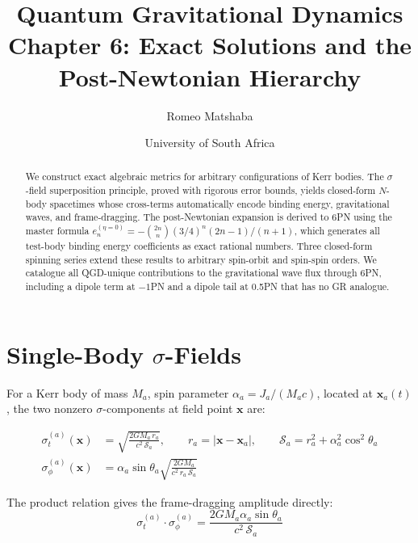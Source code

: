 \documentclass[11pt,a4paper]{article}
\title{\textbf{Quantum Gravitational Dynamics}\\[4pt]
\Large Chapter 6: Exact Solutions and the Post-Newtonian Hierarchy}
\author{Romeo Matshaba}
\date{University of South Africa}
\theoremstyle{plain}
\theoremstyle{definition}
\theoremstyle{remark}
\newcommand{\boldx}{\mathbf{x}}
\newcommand{\sig}[2]{\sigma_{#1}^{(#2)}}
\begin{document}
\maketitle

\begin{abstract}
We construct exact algebraic metrics for arbitrary configurations of Kerr bodies.  The $\sigma$-field superposition principle, proved with rigorous error bounds, yields closed-form $N$-body spacetimes whose cross-terms automatically encode binding energy, gravitational waves, and frame-dragging.  The post-Newtonian expansion is derived to 6PN using the master formula $e_n^{(\eta=0)} = -\binom{2n}{n}(3/4)^n(2n-1)/(n+1)$, which generates all test-body binding energy coefficients as exact rational numbers.  Three closed-form spinning series extend these results to arbitrary spin-orbit and spin-spin orders.  We catalogue all QGD-unique contributions to the gravitational wave flux through 6PN, including a dipole term at $-1$PN and a dipole tail at 0.5PN that has no GR analogue.
\end{abstract}

\tableofcontents

\section{Single-Body $\sigma$-Fields}
\label{sec:single_body}

For a Kerr body of mass $M_a$, spin parameter $\alpha_a = J_a/(M_ac)$, located at $\boldx_a(t)$, the two nonzero $\sigma$-components at field point $\boldx$ are:

\begin{align}
  \sig{t}{a}(\boldx) &= \sqrt{\frac{2GM_a\,r_a}{c^2\,\mathcal{S}_a}}, \qquad r_a = |\boldx - \boldx_a|, \qquad \mathcal{S}_a = r_a^2 + \alpha_a^2\cos^2\theta_a
  \label{eq:sigma_t_kerr} \\[6pt]
  \sig{\phi}{a}(\boldx) &= \alpha_a\sin\theta_a\sqrt{\frac{2GM_a}{c^2\,r_a\,\mathcal{S}_a}}
  \label{eq:sigma_phi_kerr}
\end{align}

The product relation gives the frame-dragging amplitude directly:
\begin{equation}
  \sig{t}{a}\cdot\sig{\phi}{a} = \frac{2GM_a\alpha_a\sin\theta_a}{c^2\,\mathcal{S}_a}
  \label{eq:product_relation}
\end{equation}
\end{document}
